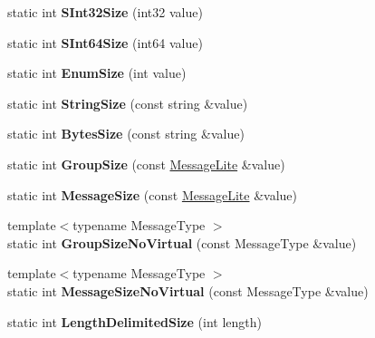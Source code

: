 \begin{DoxyCompactItemize}
static int {\bfseries S\+Int32\+Size} (int32 value)
\item 
\mbox{\label{classgoogle_1_1protobuf_1_1internal_1_1WireFormatLite_af64ebf0b76e9913082d24bb156a2993d}} 
static int {\bfseries S\+Int64\+Size} (int64 value)
\item 
\mbox{\label{classgoogle_1_1protobuf_1_1internal_1_1WireFormatLite_a70edd447b0b2f4d6cdb5ee895ab1b668}} 
static int {\bfseries Enum\+Size} (int value)
\item 
\mbox{\label{classgoogle_1_1protobuf_1_1internal_1_1WireFormatLite_afc56aa620c791f5383665ddac09364e4}} 
static int {\bfseries String\+Size} (const string \&value)
\item 
\mbox{\label{classgoogle_1_1protobuf_1_1internal_1_1WireFormatLite_a63a27c7dd7da8ff9413b8cbecc3efe01}} 
static int {\bfseries Bytes\+Size} (const string \&value)
\item 
\mbox{\label{classgoogle_1_1protobuf_1_1internal_1_1WireFormatLite_ab254d748969219e01680be2b5ac5c3f5}} 
static int {\bfseries Group\+Size} (const \hyperlink{classgoogle_1_1protobuf_1_1MessageLite}{Message\+Lite} \&value)
\item 
\mbox{\label{classgoogle_1_1protobuf_1_1internal_1_1WireFormatLite_a41898835aa411b8a4f8ba0c903a689c8}} 
static int {\bfseries Message\+Size} (const \hyperlink{classgoogle_1_1protobuf_1_1MessageLite}{Message\+Lite} \&value)
\item 
\mbox{\label{classgoogle_1_1protobuf_1_1internal_1_1WireFormatLite_a9f05ab0c496ec9d62026fcd9a580a7b5}} 
{\footnotesize template$<$typename Message\+Type $>$ }\\static int {\bfseries Group\+Size\+No\+Virtual} (const Message\+Type \&value)
\item 
\mbox{\label{classgoogle_1_1protobuf_1_1internal_1_1WireFormatLite_a4d08cbfffd3a10411a2bb7a28c5d70eb}} 
{\footnotesize template$<$typename Message\+Type $>$ }\\static int {\bfseries Message\+Size\+No\+Virtual} (const Message\+Type \&value)
\item 
\mbox{\label{classgoogle_1_1protobuf_1_1internal_1_1WireFormatLite_a99c456a8e1f01f2544b2d5e42565b407}} 
static int {\bfseries Length\+Delimited\+Size} (int length)
\end{DoxyCompactItemize}
